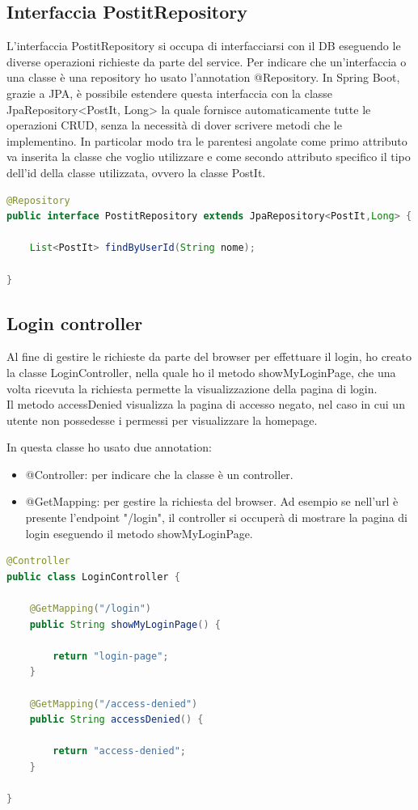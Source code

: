 \subsection{Interfaccia PostitRepository}
L'interfaccia PostitRepository si occupa di interfacciarsi con il DB eseguendo le diverse operazioni richieste da parte del service. Per indicare che un'interfaccia o una classe è una repository ho usato l'annotation @Repository.
In Spring Boot, grazie a JPA, è possibile estendere questa interfaccia con la classe JpaRepository<PostIt, Long> la quale fornisce automaticamente tutte le operazioni CRUD, senza la necessità di dover scrivere metodi che le implementino. In particolar modo tra le parentesi angolate come primo attributo va inserita la classe che voglio utilizzare e come secondo attributo specifico il tipo dell'id della classe utilizzata, ovvero la classe PostIt.\\
\begin{lstlisting}[language=Java,basicstyle=\small, caption={Interfaccia PostitRepository che estende JpaRepository}, captionpos=b]
@Repository
public interface PostitRepository extends JpaRepository<PostIt,Long> {

    List<PostIt> findByUserId(String nome);

}
\end{lstlisting}
\subsection{Login controller}
Al fine di gestire le richieste da parte del browser per effettuare il login, ho creato la classe LoginController, nella quale ho il metodo showMyLoginPage, che una volta ricevuta la richiesta permette la visualizzazione della pagina di login.\\
Il metodo accessDenied visualizza la pagina di accesso negato, nel caso in cui un utente non possedesse i permessi per visualizzare la homepage.

In questa classe ho usato due annotation:
\begin{itemize}
    \item @Controller: per indicare che la classe è un controller.
    \item @GetMapping: per gestire la richiesta del browser. Ad esempio se nell'url è presente l'endpoint "/login", il controller si occuperà di mostrare la pagina di login eseguendo il metodo showMyLoginPage.
\end{itemize}
\newpage
\begin{lstlisting}[language=Java,basicstyle=\small, caption={Login controller}, captionpos=b]
@Controller
public class LoginController {

    @GetMapping("/login")
    public String showMyLoginPage() {

        return "login-page";
    }

    @GetMapping("/access-denied")
    public String accessDenied() {

        return "access-denied";
    }
    
}
\end{lstlisting}
